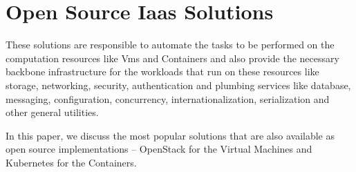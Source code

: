 \section{Open Source Iaas Solutions}

These solutions are responsible to automate the tasks to be performed on the computation resources like Vms and Containers and also provide the necessary backbone infrastructure for the workloads that run on these resources like storage, networking, security, authentication and plumbing services like database, messaging, configuration, concurrency, internationalization, serialization and other general utilities.

In this paper, we discuss the most popular solutions that are also available as open source implementations – OpenStack for the Virtual Machines and Kubernetes for the Containers.
